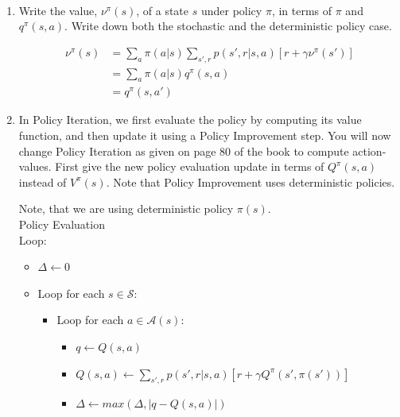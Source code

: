 \documentclass{exam}
\begin{document}
\begin{problem}
\ \newline
\begin{enumerate}
    \item Write the value, $\nu^{\pi}(s)$, of a state $s$ under policy $\pi$, in terms of $\pi$ and $q^{\pi}(s,a)$. Write down both the stochastic and the deterministic policy case.
    \begin{solutionorlines}[2in]
    \begin{align*}
        \nu^{\pi}(s) &=\sum_a \pi(a|s) \sum_{s', r} p(s', r|s, a) [r + \gamma \nu^{\pi}(s')]\\
        &= \sum_a \pi(a|s) q^{\pi}(s,a) \tag{stochastic case}\\
        &= q^{\pi}(s, a') \tag{deterministic case with policy $\pi(s) = a'$}
    \end{align*}
    \end{solutionorlines}
    \item In Policy Iteration, we first evaluate the policy by computing its value function, and then update it using a Policy Improvement step. You will now change Policy Iteration as given on page 80 of the book to compute action-values. First give the new policy evaluation update in terms of $Q^{\pi}(s, a)$ instead of $V^{\pi}(s)$. Note that Policy Improvement uses deterministic policies.
    \begin{solutionorlines}[2in]
    Note, that we are using deterministic policy $\pi(s)$.\\
    Policy Evaluation\\
    Loop:
    \begin{itemize}[noitemsep,nolistsep]
        \item[ ] $\Delta \leftarrow 0$
        \item[ ] Loop for each $s \in \mathcal{S}$:
        \begin{itemize}[noitemsep,nolistsep]
            \item[ ] Loop for each $a \in \mathcal{A}(s)$:
            \begin{itemize}[noitemsep,nolistsep]
                \item[ ] $q \leftarrow Q(s, a)$
                \item[ ] $Q(s, a) \leftarrow \sum_{s', r} p(s', r| s, a) [r + \gamma Q^{\pi}(s', \pi(s'))]$
                \item[ ] $\Delta \leftarrow max(\Delta, |q - Q(s, a)|)$
            \end{itemize}

\end{itemize}
\end{itemize}
\end{solutionorlines}
\end{enumerate}
\end{problem}
\end{document}
